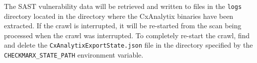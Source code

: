 The SAST vulnerability data will be retrieved and written to files in the \verb|logs| directory located in the directory where the CxAnalytix binaries
have been extracted.  If the crawl is interrupted, it will be re-started from the scan being processed when the crawl was interrupted.  To completely 
re-start the crawl, find and delete the \verb|CxAnalytixExportState.json| file in the directory specified by the \verb|CHECKMARX_STATE_PATH| 
environment variable.
